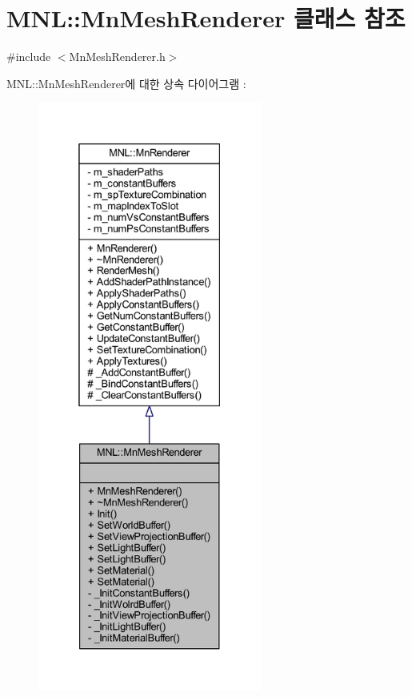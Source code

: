 \hypertarget{class_m_n_l_1_1_mn_mesh_renderer}{}\section{M\+NL\+:\+:Mn\+Mesh\+Renderer 클래스 참조}
\label{class_m_n_l_1_1_mn_mesh_renderer}


{\ttfamily \#include $<$Mn\+Mesh\+Renderer.\+h$>$}



M\+NL\+:\+:Mn\+Mesh\+Renderer에 대한 상속 다이어그램 \+: \nopagebreak
\begin{figure}[H]
\begin{center}
\leavevmode
\includegraphics[height=550pt]{class_m_n_l_1_1_mn_mesh_renderer__inherit__graph}
\end{center}
\end{figure}


